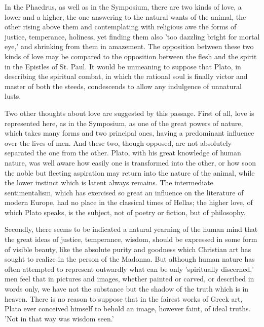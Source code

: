 \documentclass[11pt,letter]{article}
\begin{document}
\par  In the Phaedrus, as well as in the Symposium, there are two kinds of love, a lower and a higher, the one answering to the natural wants of the animal, the other rising above them and contemplating with religious awe the forms of justice, temperance, holiness, yet finding them also 'too dazzling bright for mortal eye,' and shrinking from them in amazement. The opposition between these two kinds of love may be compared to the opposition between the flesh and the spirit in the Epistles of St. Paul. It would be unmeaning to suppose that Plato, in describing the spiritual combat, in which the rational soul is finally victor and master of both the steeds, condescends to allow any indulgence of unnatural lusts.

\par  Two other thoughts about love are suggested by this passage. First of all, love is represented here, as in the Symposium, as one of the great powers of nature, which takes many forms and two principal ones, having a predominant influence over the lives of men. And these two, though opposed, are not absolutely separated the one from the other. Plato, with his great knowledge of human nature, was well aware how easily one is transformed into the other, or how soon the noble but fleeting aspiration may return into the nature of the animal, while the lower instinct which is latent always remains. The intermediate sentimentalism, which has exercised so great an influence on the literature of modern Europe, had no place in the classical times of Hellas; the higher love, of which Plato speaks, is the subject, not of poetry or fiction, but of philosophy.

\par  Secondly, there seems to be indicated a natural yearning of the human mind that the great ideas of justice, temperance, wisdom, should be expressed in some form of visible beauty, like the absolute purity and goodness which Christian art has sought to realize in the person of the Madonna. But although human nature has often attempted to represent outwardly what can be only 'spiritually discerned,' men feel that in pictures and images, whether painted or carved, or described in words only, we have not the substance but the shadow of the truth which is in heaven. There is no reason to suppose that in the fairest works of Greek art, Plato ever conceived himself to behold an image, however faint, of ideal truths. 'Not in that way was wisdom seen.'
\end{document}
